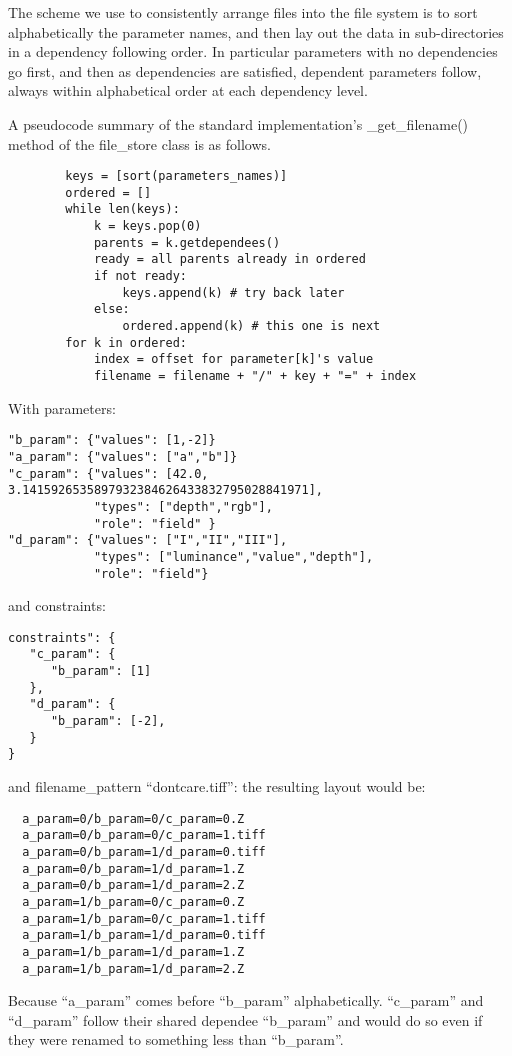 
The scheme we use to consistently arrange files into the file system is to sort alphabetically the parameter names, and then lay out the data in sub-directories in a dependency following order. In particular parameters with no dependencies go first, and then as dependencies are satisfied, dependent parameters follow, always within alphabetical order at each dependency level.

A pseudocode summary of the standard implementation's \_get\_filename() method
of the file\_store class is as follows.
\begin{verbatim}
        keys = [sort(parameters_names)]
        ordered = []
        while len(keys):
            k = keys.pop(0)
            parents = k.getdependees()
            ready = all parents already in ordered
            if not ready:
                keys.append(k) # try back later
            else:
                ordered.append(k) # this one is next
        for k in ordered:
            index = offset for parameter[k]'s value
            filename = filename + "/" + key + "=" + index
\end{verbatim}


With parameters:
\begin{verbatim}
"b_param": {"values": [1,-2]}
"a_param": {"values": ["a","b"]}
"c_param": {"values": [42.0, 3.1415926535897932384626433832795028841971],
            "types": ["depth","rgb"],
            "role": "field" }
"d_param": {"values": ["I","II","III"],
            "types": ["luminance","value","depth"],
            "role": "field"}
\end{verbatim}
and constraints:
\begin{verbatim}
constraints": {
   "c_param": {
      "b_param": [1]
   },
   "d_param": {
      "b_param": [-2],
   }
}
\end{verbatim}

and filename\_pattern ``dontcare.tiff'':
the resulting layout would be:
\begin{verbatim}
  a_param=0/b_param=0/c_param=0.Z
  a_param=0/b_param=0/c_param=1.tiff
  a_param=0/b_param=1/d_param=0.tiff
  a_param=0/b_param=1/d_param=1.Z
  a_param=0/b_param=1/d_param=2.Z
  a_param=1/b_param=0/c_param=0.Z
  a_param=1/b_param=0/c_param=1.tiff
  a_param=1/b_param=1/d_param=0.tiff
  a_param=1/b_param=1/d_param=1.Z
  a_param=1/b_param=1/d_param=2.Z
\end{verbatim}

Because ``a\_param'' comes before ``b\_param'' alphabetically. ``c\_param'' and ``d\_param'' follow their shared dependee ``b\_param'' and would do so even if they were renamed to something less than ``b\_param''.

